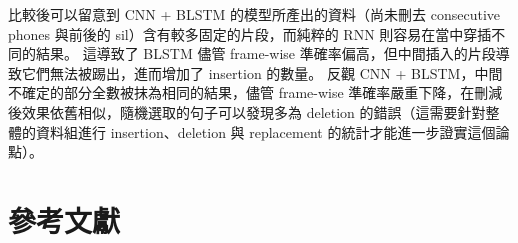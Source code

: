\documentclass[final,3p]{elsarticle}
\begin{document}
		比較後可以留意到 CNN + BLSTM 的模型所產出的資料（尚未刪去 consecutive phones 與前後的 sil）含有較多固定的片段，而純粹的 RNN 則容易在當中穿插不同的結果。
		這導致了 BLSTM 儘管 frame-wise 準確率偏高，但中間插入的片段導致它們無法被踢出，進而增加了 insertion 的數量。
		反觀 CNN + BLSTM，中間不確定的部分全數被抹為相同的結果，儘管 frame-wise 準確率嚴重下降，在刪減後效果依舊相似，隨機選取的句子可以發現多為 deletion 的錯誤（這需要針對整體的資料組進行 insertion、deletion 與 replacement 的統計才能進一步證實這個論點）。
		


%  
% 
% 
% 
% 
% 
% 
% 
% 
% 
% 
% 
% 

\section{參考文獻}


	
\end{document}

